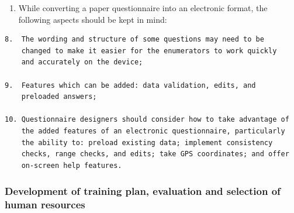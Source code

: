 \documentclass[
]{article}
\providecommand{\tightlist}{%
  \setlength{\itemsep}{0pt}\setlength{\parskip}{0pt}}
\begin{document}
\begin{enumerate}
\def\labelenumi{\arabic{enumi}.}
\setcounter{enumi}{304}
\tightlist
\item
  While converting a paper questionnaire into an electronic format,
  the following aspects should be kept in mind:
\end{enumerate}

\begin{verbatim}
8.  The wording and structure of some questions may need to be
    changed to make it easier for the enumerators to work quickly
    and accurately on the device;

9.  Features which can be added: data validation, edits, and
    preloaded answers;

10. Questionnaire designers should consider how to take advantage of
    the added features of an electronic questionnaire, particularly
    the ability to: preload existing data; implement consistency
    checks, range checks, and edits; take GPS coordinates; and offer
    on-screen help features.
\end{verbatim}

\hypertarget{development-of-training-plan-evaluation-and-selection-of-human-resources}{%
\subsubsection{Development of training plan, evaluation and selection of human resources}\label{development-of-training-plan-evaluation-and-selection-of-human-resources}}
\end{document}
